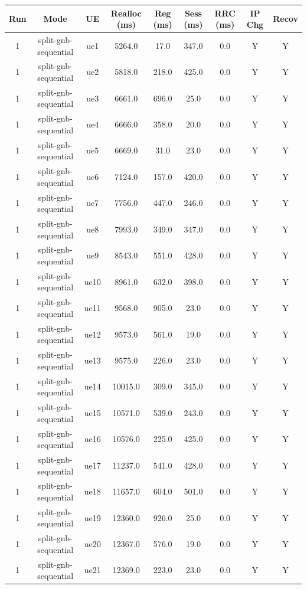 \begin{table}[ht]
\centering
\begin{tabular}{|c|c|c|c|c|c|c|c|c|}
\hline
Run & Mode & UE & Realloc (ms) & Reg (ms) & Sess (ms) & RRC (ms) & IP Chg & Recov \\
\hline
1 & split-gnb-sequential & ue1 & 5264.0 & 17.0 & 347.0 & 0.0 & Y & Y \\
1 & split-gnb-sequential & ue2 & 5818.0 & 218.0 & 425.0 & 0.0 & Y & Y \\
1 & split-gnb-sequential & ue3 & 6661.0 & 696.0 & 25.0 & 0.0 & Y & Y \\
1 & split-gnb-sequential & ue4 & 6666.0 & 358.0 & 20.0 & 0.0 & Y & Y \\
1 & split-gnb-sequential & ue5 & 6669.0 & 31.0 & 23.0 & 0.0 & Y & Y \\
1 & split-gnb-sequential & ue6 & 7124.0 & 157.0 & 420.0 & 0.0 & Y & Y \\
1 & split-gnb-sequential & ue7 & 7756.0 & 447.0 & 246.0 & 0.0 & Y & Y \\
1 & split-gnb-sequential & ue8 & 7993.0 & 349.0 & 347.0 & 0.0 & Y & Y \\
1 & split-gnb-sequential & ue9 & 8543.0 & 551.0 & 428.0 & 0.0 & Y & Y \\
1 & split-gnb-sequential & ue10 & 8961.0 & 632.0 & 398.0 & 0.0 & Y & Y \\
1 & split-gnb-sequential & ue11 & 9568.0 & 905.0 & 23.0 & 0.0 & Y & Y \\
1 & split-gnb-sequential & ue12 & 9573.0 & 561.0 & 19.0 & 0.0 & Y & Y \\
1 & split-gnb-sequential & ue13 & 9575.0 & 226.0 & 23.0 & 0.0 & Y & Y \\
1 & split-gnb-sequential & ue14 & 10015.0 & 309.0 & 345.0 & 0.0 & Y & Y \\
1 & split-gnb-sequential & ue15 & 10571.0 & 539.0 & 243.0 & 0.0 & Y & Y \\
1 & split-gnb-sequential & ue16 & 10576.0 & 225.0 & 425.0 & 0.0 & Y & Y \\
1 & split-gnb-sequential & ue17 & 11237.0 & 541.0 & 428.0 & 0.0 & Y & Y \\
1 & split-gnb-sequential & ue18 & 11657.0 & 604.0 & 501.0 & 0.0 & Y & Y \\
1 & split-gnb-sequential & ue19 & 12360.0 & 926.0 & 25.0 & 0.0 & Y & Y \\
1 & split-gnb-sequential & ue20 & 12367.0 & 576.0 & 19.0 & 0.0 & Y & Y \\
1 & split-gnb-sequential & ue21 & 12369.0 & 223.0 & 23.0 & 0.0 & Y & Y \\

\end{tabular}
\end{table}
